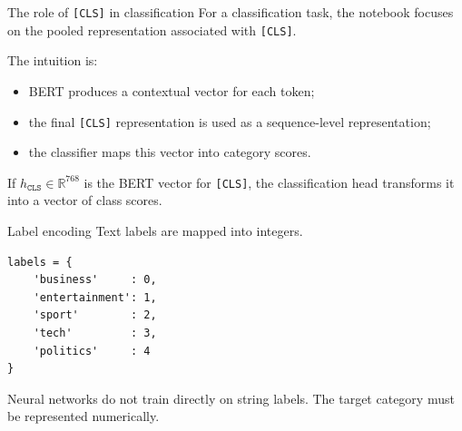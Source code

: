 \documentclass[aspectratio=169]{beamer}
\begin{document}
\begin{frame}{The role of \texttt{[CLS]} in classification}
For a classification task, the notebook focuses on the pooled representation associated with \texttt{[CLS]}.

\vspace{0.3cm}

The intuition is:
\begin{itemize}
    \item BERT produces a contextual vector for each token;
    \item the final \texttt{[CLS]} representation is used as a sequence-level representation;
    \item the classifier maps this vector into category scores.
\end{itemize}

\vspace{0.3cm}

If $h_{\texttt{CLS}} \in \mathbb{R}^{768}$ is the BERT vector for \texttt{[CLS]}, the classification head transforms it into a vector of class scores.
\end{frame}

\begin{frame}[fragile]{Label encoding}
Text labels are mapped into integers.

\begin{lstlisting}[style=pythonstyle]
labels = {
    'business'     : 0,
    'entertainment': 1,
    'sport'        : 2,
    'tech'         : 3,
    'politics'     : 4
}
\end{lstlisting}

\vspace{0.2cm}

Neural networks do not train directly on string labels. The target category must be represented numerically.
\end{frame}
\end{document}
